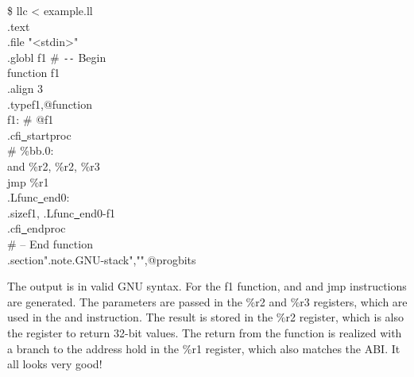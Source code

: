 \begin{tcolorbox}[colback=white,colframe=black]
\$ llc < example.ll \\
\hspace*{1cm}.text \\
\hspace*{1cm}.file \hspace{0.8cm}"<stdin>" \\
\hspace*{1cm}.globl \hspace{0.5cm}f1 \hspace{6cm} \# \verb|--| Begin \\
function f1 \\
\hspace*{1cm}.align \hspace{0.5cm} 3 \\
\hspace*{1cm}.type\hspace{0.8cm}f1,@function \\
f1: \hspace{8cm} \# @f1 \\
\hspace*{1cm}.cfi\underline{~}startproc \\
\# \%bb.0: \\
\hspace*{1cm}and \%r2, \%r2, \%r3 \\
\hspace*{1cm}jmp \%r1 \\
.Lfunc\underline{~}end0: \\
\hspace*{1cm}.size\hspace{1cm}f1, .Lfunc\underline{~}end0-f1 \\
\hspace*{1cm}.cfi\underline{~}endproc \\
\hspace*{8.8cm}\# -- End function \\
\hspace*{1cm}.section\hspace{1cm}".note.GNU-stack","",@progbits
\end{tcolorbox}

The output is in valid GNU syntax. For the f1 function, and and jmp instructions are generated. The parameters are passed in the \%r2 and \%r3 registers, which are used in
the and instruction. The result is stored in the \%r2 register, which is also the register to return 32-bit values. The return from the function is realized with a branch to the address hold in the \%r1 register, which also matches the ABI. It all looks very good!\par

